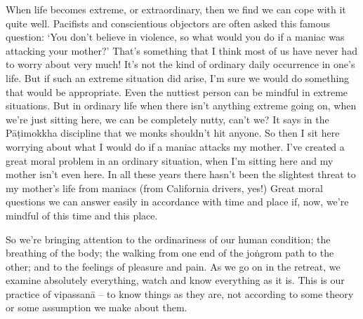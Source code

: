 When life becomes extreme, or extraordinary, then we find we can cope with it quite well. Pacifists and conscientious objectors are often asked this famous question: `You don't believe in violence, so what would you do if a maniac was attacking your mother?' That's something that I think most of us have never had to worry about very much! It's not the kind of ordinary daily occurrence in one's life. But if such an extreme situation did arise, I'm sure we would do something that would be appropriate. Even the nuttiest person can be mindful in extreme situations. But in ordinary life when there isn't anything extreme going on, when we're just sitting here, we can be completely nutty, can't we? It says in the Pāṭimokkha discipline that we monks shouldn't hit anyone. So then I sit here worrying about what I would do if a maniac attacks my mother. I've created a great moral problem in an ordinary situation, when I'm sitting here and my mother isn't even here. In all these years there hasn't been the slightest threat to my mother's life from maniacs (from California drivers, yes!) Great moral questions we can answer easily in accordance with time and place if, now, we're mindful of this time and this place.

So we're bringing attention to the ordinariness of our human condition; the breathing of the body; the walking from one end of the joṅgrom path to the other; and to the feelings of pleasure and pain. As we go on in the retreat, we examine absolutely everything, watch and know everything as it is. This is our practice of vipassanā -- to know things as they are, not according to some theory or some assumption we make about them.

